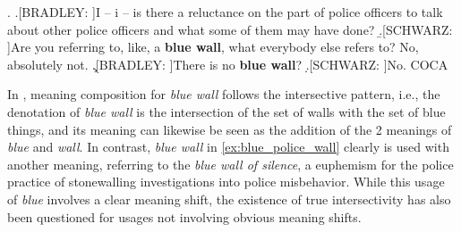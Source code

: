 \enlargethispage{1\baselineskip}
\ex. \label{ex:blue_police_wall}
\a.[BRADLEY: ]I -- i -- is there a reluctance on the part of police officers to talk about other
police officers and what some of them may have done? 
\b.[SCHWARZ: ]Are you
referring to, like, a \textbf{blue wall}, what everybody else refers to? No, absolutely
not. 
\c.[BRADLEY: ]There is no \textbf{blue wall}? 
\d.[SCHWARZ: ]No. \hfill COCA

In \LLast, meaning composition for \emph{blue wall} follows the
intersective pattern, i.e., the denotation of
\emph{blue wall} is the intersection of the set of walls with the set of blue
things, and its meaning can likewise be seen as the addition of the 2
meanings of \emph{blue} and \emph{wall}. In contrast, \emph{blue wall} in \ref{ex:blue_police_wall} clearly is used with another meaning, referring to
the \emph{blue wall of silence}, a euphemism for the police practice of
stonewalling investigations into police misbehavior. While this usage
of \emph{blue} involves a clear meaning shift, the existence of true
intersectivity has also been questioned for usages not involving
obvious meaning shifts.

